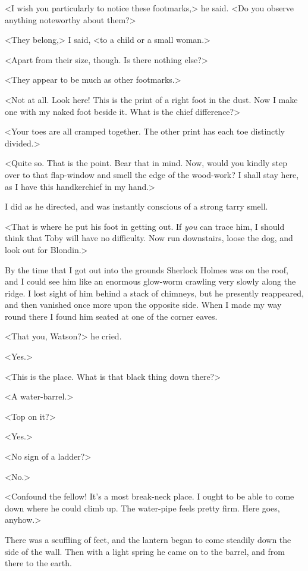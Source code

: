 <I wish you particularly to notice these footmarks,> he said. <Do you observe anything noteworthy about them?>

<They belong,> I said, <to a child or a small woman.>

<Apart from their size, though. Is there nothing else?>

<They appear to be much as other footmarks.>

<Not at all. Look here! This is the print of a right foot in the dust. Now I make one with my naked foot beside it. What is the chief difference?>

<Your toes are all cramped together. The other print has each toe distinctly divided.>

<Quite so. That is the point. Bear that in mind. Now, would you kindly step over to that flap-window and smell the edge of the wood-work? I shall stay here, as I have this handkerchief in my hand.>

I did as he directed, and was instantly conscious of a strong tarry smell.

<That is where he put his foot in getting out. If \textit{you} can trace him, I should think that Toby will have no difficulty. Now run downstairs, loose the dog, and look out for Blondin.>

By the time that I got out into the grounds Sherlock Holmes was on the roof, and I could see him like an enormous glow-worm crawling very slowly along the ridge. I lost sight of him behind a stack of chimneys, but he presently reappeared, and then vanished once more upon the opposite side. When I made my way round there I found him seated at one of the corner eaves.

<That you, Watson?> he cried.

<Yes.>

<This is the place. What is that black thing down there?>

<A water-barrel.>

<Top on it?>

<Yes.>

<No sign of a ladder?>

<No.>

<Confound the fellow! It's a most break-neck place. I ought to be able to come down where he could climb up. The water-pipe feels pretty firm. Here goes, anyhow.>

There was a scuffling of feet, and the lantern began to come steadily down the side of the wall. Then with a light spring he came on to the barrel, and from there to the earth.


